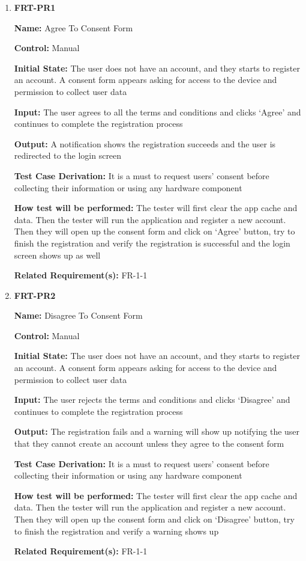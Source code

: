 \documentclass[12pt, titlepage]{article}
\begin{document}
\begin{enumerate}

\item{\textbf{FRT-PR1}}

\textbf{Name:} Agree To Consent Form

\textbf{Control:} Manual
					
\textbf{Initial State:} The user does not have an account, and they starts to register an account. A consent form appears asking for access to the device and permission to collect user data

\textbf{Input:} The user agrees to all the terms and conditions and clicks `Agree' and continues to complete the registration process
					
\textbf{Output:} A notification shows the registration succeeds and the user is redirected to the login screen

\textbf{Test Case Derivation:} It is a must to request users' consent before collecting their information or using any hardware component
					
\textbf{How test will be performed:} The tester will first clear the app cache and data. Then the tester will run the application and register a new account. Then they will open up the consent form and click on `Agree' button, try to finish the registration and verify the registration is successful and the login screen shows up as well

\textbf{Related Requirement(s):} FR-1-1
					
\item{\textbf{FRT-PR2}}

\textbf{Name:} Disagree To Consent Form

\textbf{Control:} Manual
					
\textbf{Initial State:} The user does not have an account, and they starts to register an account. A consent form appears asking for access to the device and permission to collect user data
					
\textbf{Input:} The user rejects the terms and conditions and clicks `Disagree' and continues to complete the registration process
					
\textbf{Output:} The registration fails and a warning will show up notifying the user that they cannot create an account unless they agree to the consent form

\textbf{Test Case Derivation:} It is a must to request users' consent before collecting their information or using any hardware component

\textbf{How test will be performed:} The tester will first clear the app cache and data. Then the tester will run the application and register a new account. Then they will open up the consent form and click on `Disagree' button, try to finish the registration and verify a warning shows up

\textbf{Related Requirement(s):} FR-1-1

\end{enumerate}
\end{document}
